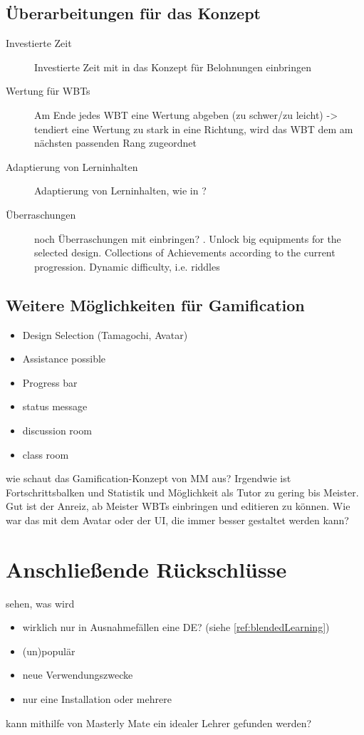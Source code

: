 \subsection{Überarbeitungen für das Konzept}
\begin{k}
\begin{description}
\item[Investierte Zeit] Investierte Zeit mit in das Konzept für Belohnungen
einbringen
\item[Wertung für WBTs] Am Ende jedes WBT eine Wertung abgeben (zu schwer/zu leicht) -> tendiert
  eine Wertung zu stark in eine Richtung, wird das WBT dem am nächsten passenden
  Rang zugeordnet
\item[Adaptierung von Lerninhalten] Adaptierung von Lerninhalten, wie in
\cite{knall:2005}?
\item[Überraschungen] noch Überraschungen mit einbringen? \cite{korte:2009}.
Unlock big equipments for the selected design. Collections of Achievements
according to the current progression. Dynamic difficulty, i.e. riddles
\end{description}
\end{k}
\begin{k}

\subsection{Weitere Möglichkeiten für Gamification}
\begin{itemize}
\item Design Selection (Tamagochi, Avatar)
  \item Assistance possible
  \item Progress bar
  \item status message
  \item discussion room
  \item class room
  \end{itemize}
  
wie schaut das Gamification-Konzept von MM aus? Irgendwie ist Fortschrittsbalken
und Statistik und Möglichkeit als Tutor zu gering bis Meister. Gut ist der
Anreiz, ab Meister WBTs einbringen und editieren zu können. Wie war das mit dem
Avatar oder der UI, die immer besser gestaltet werden kann?

\end{k}

\section{Anschließende Rückschlüsse}\label{ref:anschlVorh}
\begin{k}
sehen, was wird
\begin{itemize}
  \item wirklich nur in Ausnahmefällen eine DE? (siehe
  \ref{ref:blendedLearning})
  \item (un)populär
  \item neue Verwendungszwecke
  \item nur eine Installation oder mehrere
\end{itemize}

kann mithilfe von Masterly Mate ein idealer Lehrer gefunden werden?
\end{k}